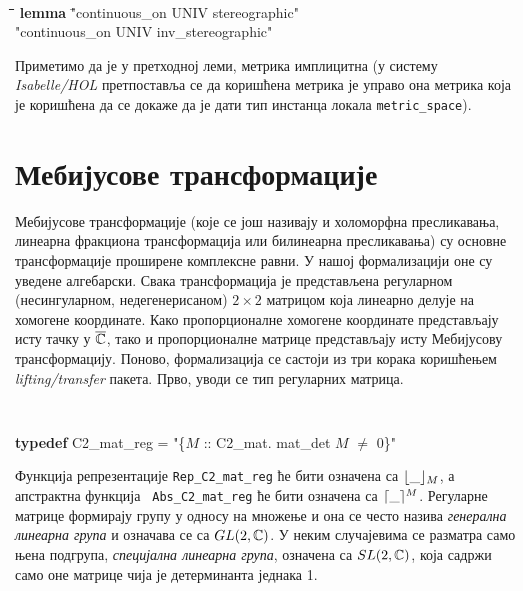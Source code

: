 {\tt
  \begin{tabbing}
    \hspace{5mm}\=\hspace{5mm}\=\hspace{5mm}\=\hspace{5mm}\=\hspace{5mm}\=\kill
\textbf{lemma} \="continuous\_on UNIV stereographic" \\
\> "continuous\_on UNIV inv\_stereographic"
  \end{tabbing}
}

Приметимо да је у претходној леми, метрика имплицитна (у систему
\emph{Isabelle/HOL} претпоставља се да коришћена метрика је управо она
метрика која је коришћена да се докаже да је дати тип инстанца локала
{\tt metric\_space}).

\section{Мебијусове трансформације}
\label{subsec:mobius}
Мебијусове трансформације (које се још називају и холоморфна
пресликавања, линеарна фракциона трансформација или билинеарна
пресликавања) су основне трансформације проширене комплексне равни. У
нашој формализацији оне су уведене алгебарски. Свака трансформација је
представљена регуларном (несингуларном, недегенерисаном) $2\times 2$
матрицом која линеарно делује на хомогене координате. Како
пропорционалне хомогене координате представљају исту тачку у $\overline{\mathbb{C}}$,
тако и пропорционалне матрице представљају исту Мебијусову
трансформацију. Поново, формализација се састоји из три корака
коришћењем \emph{lifting/transfer} пакета. Прво, уводи се тип
регуларних матрица.

{\tt
\begin{tabbing}
\textbf{typedef} C2\_mat\_reg = "\{$M$ :: C2\_mat. mat\_det $M$ $\neq$ 0\}"
\end{tabbing}
}

\noindent Функција репрезентације {\tt Rep\_C2\_mat\_reg} ће бити
означена са $\lfloor\_\rfloor_{M}$, а апстрактна функција {\tt
  Abs\_C2\_mat\_reg} ће бити означена са $\lceil\_\rceil^{M}$. Регуларне
матрице формирају групу у односу на множење и она се често назива
\emph{генерална линеарна група} и означава се са $GL(2, \mathbb{C})$. У неким
случајевима се разматра само њена подгрупа, \emph{специјална линеарна
  група}, означена са $SL(2, \mathbb{C})$, која садржи само оне матрице чија
је детерминанта једнака 1.

